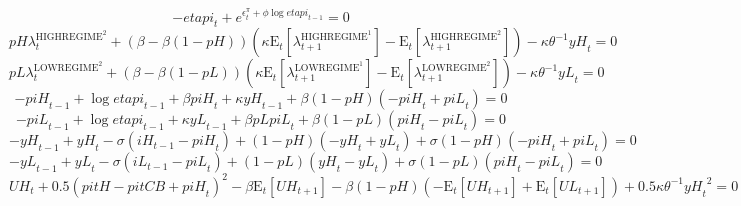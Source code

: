 \begin{equation}
-{e\!t\!a\!p\!i}_{t} + e^{\epsilon^{\pi}_{t} + {\phi} {\log{{e\!t\!a\!p\!i}_{t-1}}}} = 0
\end{equation}
\begin{equation}
{{p\!H}} {\lambda^{\mathrm{HIGHREGIME}^{\mathrm{2}}}_{t}} + \left(\beta - {\beta} \left(1 - {p\!H}\right)\right) \left({\kappa} {\mathrm{E}_{t}\left[\lambda^{\mathrm{HIGHREGIME}^{\mathrm{1}}}_{t+1}\right]} - \mathrm{E}_{t}\left[\lambda^{\mathrm{HIGHREGIME}^{\mathrm{2}}}_{t+1}\right]\right) - {\kappa} {\theta}^{-1} {{y\!H}_{t}} = 0
\end{equation}
\begin{equation}
{{p\!L}} {\lambda^{\mathrm{LOWREGIME}^{\mathrm{2}}}_{t}} + \left(\beta - {\beta} \left(1 - {p\!L}\right)\right) \left({\kappa} {\mathrm{E}_{t}\left[\lambda^{\mathrm{LOWREGIME}^{\mathrm{1}}}_{t+1}\right]} - \mathrm{E}_{t}\left[\lambda^{\mathrm{LOWREGIME}^{\mathrm{2}}}_{t+1}\right]\right) - {\kappa} {\theta}^{-1} {{y\!L}_{t}} = 0
\end{equation}
\begin{equation}
-{p\!i\!H}_{t-1} + \log{{e\!t\!a\!p\!i}_{t-1}} + {\beta} {{p\!i\!H}_{t}} + {\kappa} {{y\!H}_{t-1}} + {\beta} \left(1 - {p\!H}\right) \left(-{p\!i\!H}_{t} + {p\!i\!L}_{t}\right) = 0
\end{equation}
\begin{equation}
-{p\!i\!L}_{t-1} + \log{{e\!t\!a\!p\!i}_{t-1}} + {\kappa} {{y\!L}_{t-1}} + {\beta} {{p\!L}} {{p\!i\!L}_{t}} + {\beta} \left(1 - {p\!L}\right) \left({p\!i\!H}_{t} - {p\!i\!L}_{t}\right) = 0
\end{equation}
\begin{equation}
-{y\!H}_{t-1} + {y\!H}_{t} - {\sigma} \left({i\!H}_{t-1} - {p\!i\!H}_{t}\right) + \left(1 - {p\!H}\right) \left(-{y\!H}_{t} + {y\!L}_{t}\right) + {\sigma} \left(1 - {p\!H}\right) \left(-{p\!i\!H}_{t} + {p\!i\!L}_{t}\right) = 0
\end{equation}
\begin{equation}
-{y\!L}_{t-1} + {y\!L}_{t} - {\sigma} \left({i\!L}_{t-1} - {p\!i\!L}_{t}\right) + \left(1 - {p\!L}\right) \left({y\!H}_{t} - {y\!L}_{t}\right) + {\sigma} \left(1 - {p\!L}\right) \left({p\!i\!H}_{t} - {p\!i\!L}_{t}\right) = 0
\end{equation}
\begin{equation}
{U\!H}_{t} + 0.5\left({p\!i\!t\!H} - {p\!i\!t\!C\!B} + {p\!i\!H}_{t}\right)^{2} - {\beta} {\mathrm{E}_{t}\left[{U\!H}_{t+1}\right]} - {\beta} \left(1 - {p\!H}\right) \left(-\mathrm{E}_{t}\left[{U\!H}_{t+1}\right] + \mathrm{E}_{t}\left[{U\!L}_{t+1}\right]\right) + 0.5{\kappa} {\theta}^{-1} {{y\!H}_{t}}^{2} = 0
\end{equation}
